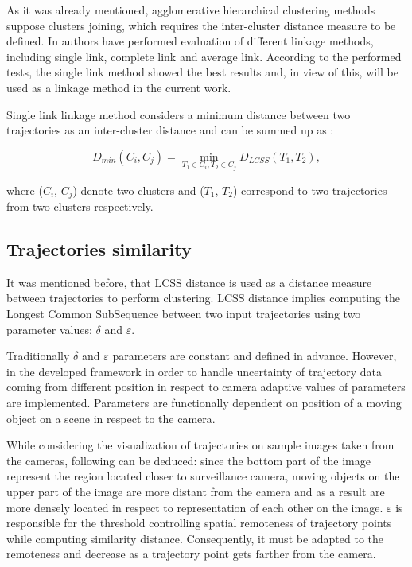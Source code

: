 As it was already mentioned, agglomerative hierarchical clustering methods suppose clusters joining, which requires the inter-cluster distance measure to be defined. In \cite{inproceedings:7_related_work} authors have performed evaluation of different linkage methods, including single link, complete link and average link. According to the performed tests, the single link method showed the best results and, in view of this, will be used as a linkage method in the current work.

Single link linkage method considers a minimum distance between two trajectories as an inter-cluster distance and can be summed up as \cite{inproceedings:7_related_work}:

\begin{equation} \label{eq:single_link}
D_{min}(C_i, C_j) = \min_{T_1 \in C_i, T_2 \in C_j} D_{LCSS}(T_1, T_2),
\end{equation} 

where ($C_i$, $C_j$) denote two clusters and ($T_1$, $T_2$) correspond to two trajectories from two clusters respectively.

\subsection{Trajectories similarity}

It was mentioned before, that LCSS distance is used as a distance measure between trajectories to perform clustering. LCSS distance implies computing the Longest Common SubSequence between two input trajectories using two parameter values: $\delta$ and $\varepsilon$. 

Traditionally $\delta$ and $\varepsilon$ parameters are constant and defined in advance. However, in the developed framework in order to handle uncertainty of trajectory data coming from different position in respect to camera adaptive values of parameters are implemented. Parameters are functionally dependent on position of a moving object on a scene in respect to the camera. 

While considering the visualization of trajectories on sample images taken from the cameras, following can be deduced: since the bottom part of the image represent the region located closer to surveillance camera, moving objects on the upper part of the image are more distant from the camera and as a result are more densely located in respect to representation of each other on the image. $\varepsilon$ is responsible for the threshold controlling spatial remoteness of trajectory points while computing similarity distance. Consequently, it must be adapted to the remoteness and decrease as a trajectory point gets farther from the camera.

